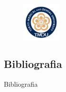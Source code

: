\documentclass[]{beamer}
\begin{document}
\begin{frame}{}
\begin{figure}[H]
    \includegraphics[width = 0.18\textwidth]{img/tmdu.jpg}
  \end{figure}
  \begin{block}{}
    \begin{center}
      {}
    \end{center}
  \end{block}
\end{frame}
\appendix
\begin{frame}[plain]{}

\end{frame}
\subsection{Bibliografia}
\nocite{*}
\begin{frame}[plain]{Bibliografia}
  \nocite{*}
  
  
\end{frame}
  
\end{document}
